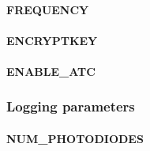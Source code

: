 \documentclass[10pt]{article}
\begin{document}
\paragraph{FREQUENCY}

\paragraph{ENCRYPTKEY}

\paragraph{ENABLE\_ATC}

\subsubsection{Logging parameters}

\paragraph{NUM\_PHOTODIODES}
\end{document}
